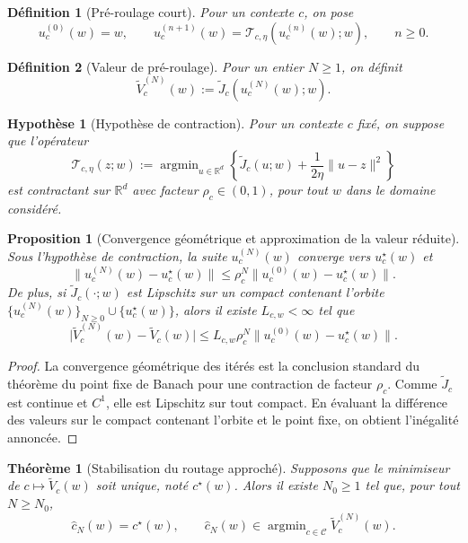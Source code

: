 \documentclass[11pt,a4paper]{article}
\newtheorem{definition}{Définition}[section]
\newtheorem{assumption}{Hypothèse}[section]
\newtheorem{proposition}{Proposition}[section]
\newtheorem{theorem}{Théorème}[section]
\DeclareMathOperator{\argmin}{argmin}
\newcommand{\R}{\mathbb R}
\newcommand{\Ccal}{\mathcal C}
\newcommand{\Tcal}{\mathcal T}
\begin{document}
\begin{definition}[Pré-roulage court]
Pour un contexte \(c\), on pose
\[
u_c^{(0)}(w)=w,
\qquad
u_c^{(n+1)}(w)=\Tcal_{c,\eta}(u_c^{(n)}(w);w),
\qquad n\ge 0.
\]
\end{definition}

\begin{definition}[Valeur de pré-roulage]
Pour un entier \(N\ge 1\), on définit
\[
\widetilde V_c^{(N)}(w):=\widetilde J_c(u_c^{(N)}(w);w).
\]
\end{definition}

\begin{assumption}[Hypothèse de contraction]
Pour un contexte \(c\) fixé, on suppose que l'opérateur
\[
\Tcal_{c,\eta}(z;w):=\argmin_{u\in\R^d}\left\{\widetilde J_c(u;w)+\frac{1}{2\eta}\|u-z\|^2\right\}
\]
est contractant sur \(\R^d\) avec facteur \(\rho_c\in(0,1)\), pour tout \(w\) dans le domaine considéré.
\end{assumption}

\begin{proposition}[Convergence géométrique et approximation de la valeur réduite]
Sous l'hypothèse de contraction, la suite \(u_c^{(N)}(w)\) converge vers \(u_c^\star(w)\) et
\[
\|u_c^{(N)}(w)-u_c^\star(w)\|\le \rho_c^N\|u_c^{(0)}(w)-u_c^\star(w)\|.
\]
De plus, si \(\widetilde J_c(\cdot;w)\) est Lipschitz sur un compact contenant l'orbite \(\{u_c^{(N)}(w)\}_{N\ge 0}\cup\{u_c^\star(w)\}\), alors il existe \(L_{c,w}<\infty\) tel que
\[
\bigl|\widetilde V_c^{(N)}(w)-\widetilde V_c(w)\bigr|\le L_{c,w}\rho_c^N\|u_c^{(0)}(w)-u_c^\star(w)\|.
\]
\end{proposition}

\begin{proof}
La convergence géométrique des itérés est la conclusion standard du théorème du point fixe de Banach pour une contraction de facteur \(\rho_c\). Comme \(\widetilde J_c\) est continue et \(C^1\), elle est Lipschitz sur tout compact. En évaluant la différence des valeurs sur le compact contenant l'orbite et le point fixe, on obtient l'inégalité annoncée.
\end{proof}

\begin{theorem}[Stabilisation du routage approché]
Supposons que le minimiseur de \(c\mapsto\widetilde V_c(w)\) soit unique, noté \(c^\star(w)\). Alors il existe \(N_0\ge 1\) tel que, pour tout \(N\ge N_0\),
\[
\hat c_N(w)=c^\star(w),
\qquad
\hat c_N(w)\in\argmin_{c\in\Ccal}\widetilde V_c^{(N)}(w).
\]
\end{theorem}
\end{document}
